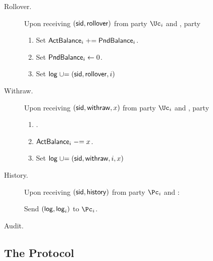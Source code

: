 \begin{functionality}
\begin{description}
		\item[Rollover.]     Upon receiving $(\mathsf{sid},\mathsf{rollover})$ from  party $\Uc_i$ and \Cc,  party \Cc
		
		\begin{enumerate}
			
			
			\item Set $\mathsf{ActBalance}_i  \mathrel{+}= \mathsf{PndBalance}_i$.
			
			\item Set $\mathsf{PndBalance}_i  \leftarrow 0$.
			
			\item Set $\mathsf{log} \mathrel{\cup}= (\mathsf{sid},\mathsf{rollover},i)$
			
			
		\end{enumerate}

		
			\item[Withraw.]     Upon receiving $(\mathsf{sid},\mathsf{withraw},x)$ from  party $\Uc_i$ and \Cc,  party \Cc
		
		\begin{enumerate}
			
			
			 \item \Assert{$x\in \N$, $\balance_i  \ge x$ and $i \in [n]$}.
			
			\item $\mathsf{ActBalance}_i \mathrel{-}= x$.
			
			
			\item Set $\mathsf{log} \mathrel{\cup}= {(\mathsf{sid},\mathsf{withraw},i,x)}$
			
			
		\end{enumerate}
		
		
		\item[History.]     Upon receiving $(\mathsf{sid},\mathsf{history})$ from  party $\Pc_i$ and \Cc:  
		
		Send $(\mathsf{log},\mathsf{log}_i)$ to  $\Pc_i$.	 
		
		\item[Audit.]      
		
	\end{description}

\end{functionality}

\subsection{The Protocol}\label{sec:MainProtocol:Protocol}


